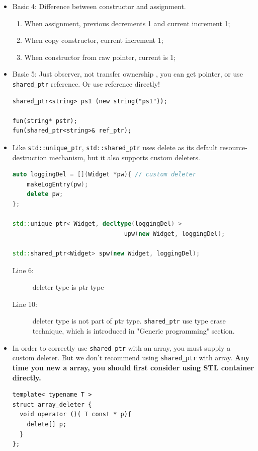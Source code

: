 \documentclass[a4paper,11pt,twoside]{book}
\begin{document}
\begin{itemize}
\item Basic 4: Difference between constructor and assignment.
\begin{enumerate}
\item When assignment, previous decrements 1 and current increment 1;
\item When copy constructor, current increment 1;
\item When constructor from raw pointer, current is 1;
\end{enumerate}

\item Basic 5: Just observer, not transfer ownership , you can get pointer, or use \texttt{shared\_ptr} reference. Or use reference directly!
\begin{lstlisting}[numbers = none]
shared_ptr<string> ps1 (new string("ps1"));

fun(string* pstr);
fun(shared_ptr<string>& ref_ptr);
\end{lstlisting}


\item Like \texttt{std::unique\_ptr}, \texttt{std::shared\_ptr} uses delete as its default resource-destruction mechanism, but it also supports custom deleters.
\begin{lstlisting}[frame=single, language=c++]
auto loggingDel = [](Widget *pw){ // custom deleter
	makeLogEntry(pw);
	delete pw;
};

std::unique_ptr< Widget, decltype(loggingDel) >
                               upw(new Widget, loggingDel);

std::shared_ptr<Widget> spw(new Widget, loggingDel);
\end{lstlisting}
\begin{description}
	\item[Line 6:] deleter type is ptr type
	\item[Line 10:] deleter type is not part of ptr type. \texttt{shared\_ptr} use type erase technique, which is introduced in "Generic programming" section. 
\end{description}

\item In order to correctly use \texttt{shared\_ptr} with an array, you must supply a custom deleter. But we don't recommend using \texttt{shared\_ptr} with array. \textbf{Any time you new a array, you should first consider using STL container directly.}
\begin{lstlisting}[numbers=none]
template< typename T >
struct array_deleter {
  void operator ()( T const * p){
    delete[] p;
  }
};


\end{lstlisting}
\end{itemize}
\end{document}

